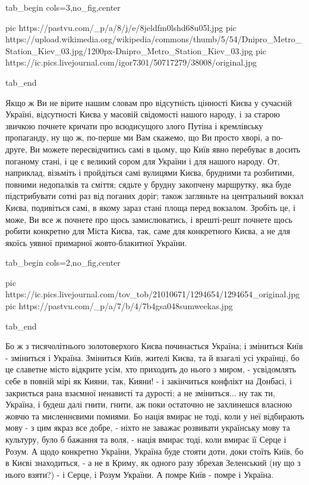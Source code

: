 \ifcmt
  tab_begin cols=3,no_fig,center

     pic https://pastvu.com/_p/a/8/j/e/8jeldfm0lshd68u05l.jpg
		 pic https://upload.wikimedia.org/wikipedia/commons/thumb/5/54/Dnipro_Metro_Station_Kiev_03.jpg/1200px-Dnipro_Metro_Station_Kiev_03.jpg
		 pic https://ic.pics.livejournal.com/igor7301/50717279/38008/original.jpg

  tab_end
\fi

Якщо ж Ви не вірите нашим словам про відсутність цінності Києва у сучасній
Україні, відсутності Києва у масовій свідомості нашого народу, і за старою
звичкою почнете кричати про всюдисущого злого Путіна і кремлівську пропаганду,
ну що ж, по-перше ми Вам скажемо, що Ви просто хворі, а по-друге, Ви можете
пересвідчитись самі в цьому, що Київ явно перебуває в досить поганому стані, і
це є великий сором для України і для нашого народу. От, наприклад, візьміть і
пройдіться самі вулицями Києва, брудними та розбитими, повними недопалків та
сміття; сядьте у брудну закопчену маршрутку, яка буде підстрибувати сотні раз
від поганих доріг; також загляньте на центральний вокзал Києва, подивіться
самі, в якому зараз стані площа перед вокзалом.  Зробіть це, і може, Ви все ж
почнете про щось замислюватись, і врешті-решт почнете щось робити конкретно для
Міста Києва, так, саме для конкретного Києва, а не для якоїсь уявної
примарної жовто-блакитної України.


\ifcmt
  tab_begin cols=2,no_fig,center

     pic https://ic.pics.livejournal.com/tov_tob/21010671/1294654/1294654_original.jpg
		 pic https://pastvu.com/_p/a/7/b/4/7b4gsa048sumweekas.jpg

  tab_end
\fi

Бо ж з тисячолітнього золотоверхого Києва починається Україна; і зміниться Київ
- зміниться і Україна. Зміниться Київ, жителі Києва, та й взагалі усі українці,
бо це славетне місто відкрите усім, хто приходить до нього з миром, -
усвідомлять себе в повній мірі як Кияни, так, Кияни! - і закінчиться конфлікт
на Донбасі, і закриється рана взаємної ненависті та дурості; а не зміниться...
ну так ти, Україна, і будеш далі гнити, гнити, аж поки остаточно не захлинешся
власною жовчю та мисленнєвими помиями.  Бо нація вмирає не тоді, коли у неї
відбирають мову - з цим якраз все добре, - ніхто не заважає розвивати
українську мову та культуру, було б бажання та воля, - нація вмирає тоді, коли
вмирає її Серце і Розум. А щодо конкретно України, Україна буде стояти доти,
доки стоїть Київ, бо в Києві знаходиться, - а не в Криму, як одного разу
збрехав Зеленський (ну що з нього взяти?) - і Серце, і Розум України. А помре
Київ - помре і Україна.

